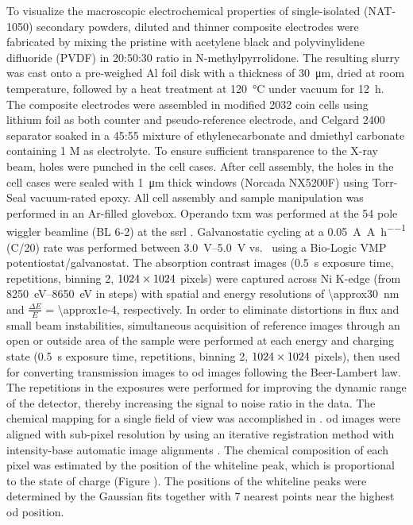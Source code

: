 \documentclass{article}
\begin{document}
To visualize the macroscopic electrochemical properties of
single-isolated \nca{} (NAT-1050) secondary powders, diluted and
thinner composite electrodes were fabricated by mixing the pristine
\nca{} with acetylene black and polyvinylidene difluoride (PVDF) in
20:50:30 ratio in N-methylpyrrolidone. The resulting slurry was cast
onto a pre-weighed Al foil disk with a thickness of
\SI{30}{\micro\meter}, dried at room temperature, followed by a heat
treatment at \SI{120}{\celsius} under vacuum for \SI{12}{\hour}. The
composite electrodes were assembled in  modified
2032 coin cells using lithium foil as both counter and
pseudo-reference electrode, and Celgard 2400 separator soaked in a
45:55 mixture of ethylenecarbonate and dmiethyl carbonate containing 1
M  as electrolyte. To ensure sufficient transparence to the
X-ray beam, holes were punched in the cell cases. After cell assembly,
the holes in the cell cases were sealed with \SI{1}{\micro\meter}
thick  windows (Norcada NX5200F) using Torr-Seal
vacuum-rated epoxy. All cell assembly and sample manipulation was
performed in an Ar-filled glovebox. Operando \gls{txm} was performed
at the 54 pole wiggler beamline (BL 6-2) at the \gls{ssrl}
\cite{yun2008}. Galvanostatic cycling at a
\SI{0.05}{\ampere\per\ampere\per\hour} (C/20) rate was performed
between \SIrange{3.0}{5.0}{\volt} vs.\  using a Bio-Logic
VMP potentiostat/galvanostat. The absorption contrast images
(\SI{0.5}{\second} exposure time,  repetitions,
binning 2, $\rm 1024\times 1024$ pixels) were captured across Ni
K-edge (from \SIrange{8250}{8650}{\electronvolt} in  steps) with spatial and energy resolutions of
\SI{\approx30}{\nano\meter} and $\frac{\Delta E}{E}$ =
\num{\approx1e-4}, respectively. In order to eliminate distortions in
flux and small beam instabilities, simultaneous acquisition of
reference images through an open or outside area of the sample were
performed at each energy and charging state (\SI{0.5}{\second}
exposure time,  repetitions, binning 2, $\rm 1024
\times 1024$ pixels), then used for converting transmission images to
\gls{od} images following the Beer-Lambert law. The repetitions in the
exposures were performed for improving the dynamic range of the
detector, thereby increasing the signal to noise ratio in the
data. The chemical mapping for a single field of view was accomplished
in . \Gls{od} images were aligned with
sub-pixel resolution by using an iterative registration method with
intensity-base automatic image alignments \cite{lee2019-3}. The
chemical composition of each pixel was estimated by the position of
the whiteline peak, which is proportional to the state of charge
(Figure ). The positions of the whiteline
peaks were determined by the Gaussian fits together with 7 nearest
points near the highest \gls{od} position.
\end{document}
